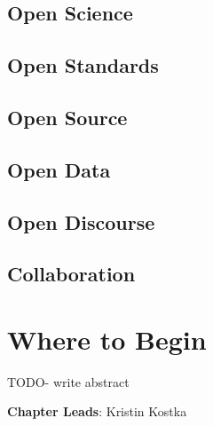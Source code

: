\documentclass[
  letterpaper,
  paper=7in:10in,
  pagesize=pdftex,
  headinclude=on,
  footinclude=on,
  12pt]{scrbook}
\begin{document}
\section{Open Science}\label{sec-ohdsi-principles-science}

\section{Open Standards}\label{sec-ohdsi-principles-standards}

\section{Open Source}\label{sec-ohdsi-principles-source}

\section{Open Data}\label{sec-ohdsi-principles-data}

\section{Open Discourse}\label{sec-ohdsi-principles-discource}

\section{Collaboration}\label{sec-ohdsi-principles-collaboration}

\chapter{Where to Begin}\label{sec-ohdsi-begin}

TODO- write abstract

\hfill\break

\textbf{Chapter Leads}: Kristin Kostka
\end{document}
